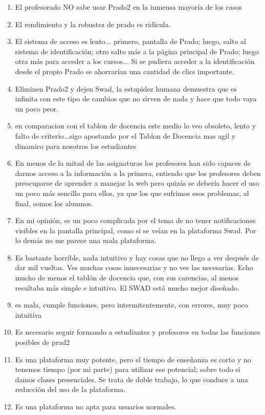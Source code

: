 \begin{enumerate}
\item El profesorado NO sabe usar Prado2 en la inmensa mayoría de los casos
\item El rendimiento y la robustez de prado es ridícula. 
\item El sistema de acceso es lento... primero, pantalla de Prado; luego, salto al sistema de identificación; otro salto más a la página principal de Prado; luego otra más para acceder a los cursos... Si se pudiera acceder a la identificación desde el propio Prado se ahorrarían una cantidad de clics importante. 
\item Eliminen Prado2 y dejen Swad, la estupidez humana demuestra que es infinita con este tipo de cambios que no sirven de nada y hace que todo vaya un poco peor.
\item en comparacion con el tablon de docencia este medio lo veo obsoleto, lento y falto de criterio...sigo apostando por el Tablon de Docencia mas agil y dinamico para nosotros los estudiantes
\item En menos de la mitad de las asignaturas los profesores han sido capaces de darnos acceso a la información a la primera, entiendo que los profesores deben preocuparse de aprender a manejar la web pero quizás se debería hacer el uso un poco más sencillo para ellos, ya que los que sufrimos esos problemas, al final, somos los alumnos.
\item En mi opinión, es un poco complicada por el tema de no tener notificaciones visibles en la pantalla principal, como si se veían en la plataforma Swad. Por lo demás no me parece una mala plataforma.
\item Es bastante horrible, nada intuitivo y hay cosas que no llego a ver después de dar mil vueltas. Ves muchas cosas innecesarias y no ves las necesarias. Echo mucho de menos el tablón de docencia que, con sus carencias, al menos resultaba más simple e intuitivo. El SWAD está mucho mejor diseñado.
\item es mala, cumple funciones, pero intermitentemente, con errores, muy poco intuitiva
\item Es necesario seguir formando a estudiantes y profesores en todas las funciones posibles de prad2
\item Es una plataforma muy potente, pero el tiempo de enseñanza es corto y no tenemos tiempo (por mi parte) para utilizar ese potencial; sobre todo si damos clases presenciales. Se trata de doble trabajo, lo que conduce a una reducción del uso de la plataforma.
\item Es una plataforma no apta para usuarios normales.

\end{enumerate}
